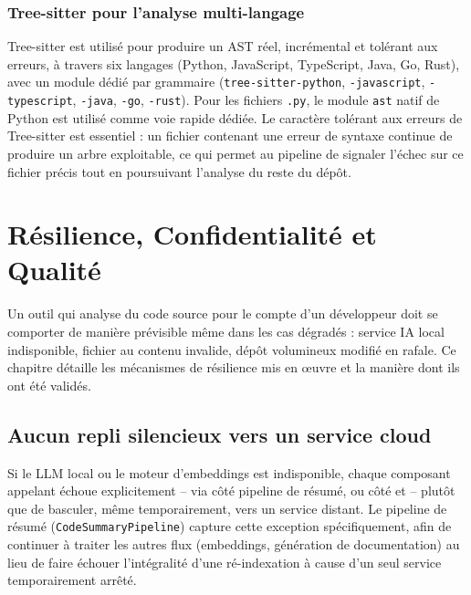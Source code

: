 \documentclass[12pt,a4paper]{report}
\begin{document}
\subsection{Tree-sitter pour l'analyse multi-langage}
Tree-sitter est utilisé pour produire un AST réel, incrémental et tolérant aux
erreurs, à travers six langages (Python, JavaScript, TypeScript, Java, Go, Rust),
avec un module dédié par grammaire
(\texttt{tree-sitter-python}, \texttt{-javascript}, \texttt{-typescript},
\texttt{-java}, \texttt{-go}, \texttt{-rust}). Pour les fichiers \texttt{.py}, le
module \texttt{ast} natif de Python est utilisé comme voie rapide dédiée. Le
caractère tolérant aux erreurs de Tree-sitter est essentiel : un fichier contenant
une erreur de syntaxe continue de produire un arbre exploitable, ce qui permet au
pipeline de signaler l'échec sur ce fichier précis tout en poursuivant l'analyse du
reste du dépôt.

\newpage

\chapter{Résilience, Confidentialité et Qualité}

Un outil qui analyse du code source pour le compte d'un développeur doit se
comporter de manière prévisible même dans les cas dégradés : service IA local
indisponible, fichier au contenu invalide, dépôt volumineux modifié en rafale. Ce
chapitre détaille les mécanismes de résilience mis en œuvre et la manière dont ils
ont été validés.

\section{Aucun repli silencieux vers un service cloud}
\begin{sloppypar}
Si le LLM local ou le moteur d'embeddings est indisponible, chaque composant
appelant échoue explicitement -- via  côté
pipeline de résumé, ou  côté  et
 -- plutôt que de basculer, même temporairement, vers un
service distant. Le pipeline de résumé (\texttt{CodeSummaryPipeline}) capture cette
exception spécifiquement, afin de continuer à traiter les autres flux (embeddings,
génération de documentation) au lieu de faire échouer l'intégralité d'une
ré-indexation à cause d'un seul service temporairement arrêté.
\end{sloppypar}
\end{document}

